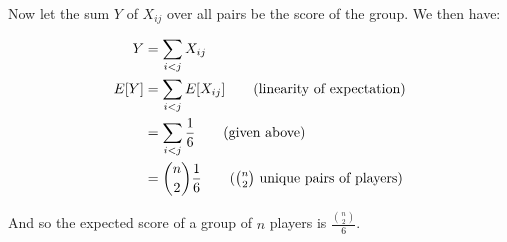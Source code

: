 \documentclass{article}
\begin{document}
Now let the sum $Y$ of $X_{ij}$ over all pairs be the score of the group. We then have:

\begin{align*}
    Y&=\sum_{i<j}X_{ij}\\
    E[Y]&=\sum_{i<j}E[X_{ij}]\tag{linearity of expectation}\\
    &=\sum_{i<j}\frac{1}{6}\tag{given above}\\
    &=\binom{n}{2}\frac{1}{6}\tag{$\binom{n}{2}$ unique pairs of players}
\end{align*}

And so the expected score of a group of $n$ players is $\frac{\binom{n}{2}}{6}$.
\end{document}
